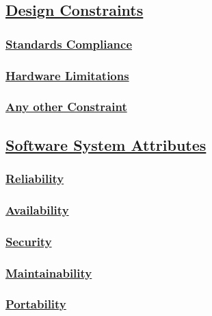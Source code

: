 \subsection[Design Constraints]{\hyperlink{toc}{Design Constraints}}
	\subsubsection[Standards Compliance]{\hyperlink{toc}{Standards Compliance}}
	\subsubsection[Hardware Limitations]{\hyperlink{toc}{Hardware Limitations}}
	\subsubsection[Any other Constraint]{\hyperlink{toc}{Any other Constraint}}

\subsection[Software System Attributes]{\hyperlink{toc}{Software System Attributes}}
	\subsubsection[Reliability]{\hyperlink{toc}{Reliability}}
	\subsubsection[Availability]{\hyperlink{toc}{Availability}}
	\subsubsection[Security]{\hyperlink{toc}{Security}}
	\subsubsection[Maintainability]{\hyperlink{toc}{Maintainability}}
	\subsubsection[Portability]{\hyperlink{toc}{Portability}}
